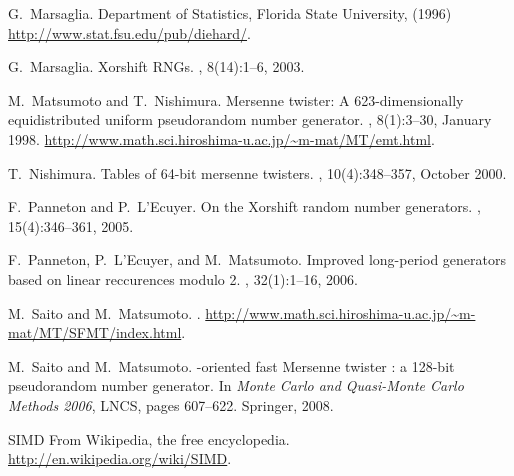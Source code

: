 \documentclass{svmult}
\begin{document}
\begin{thebibliography}{10}
G.~Marsaglia.
\newblock Department of Statistics, Florida State University, (1996)
  \url{http://www.stat.fsu.edu/pub/diehard/}.

G.~Marsaglia.
\newblock Xorshift {RNGs}.
, 8(14):1--6, 2003.

M.~Matsumoto and T.~Nishimura.
\newblock Mersenne twister: A 623-dimensionally equidistributed uniform
  pseudorandom number generator.
, 8(1):3--30,
  January 1998.
\newblock \url{http://www.math.sci.hiroshima-u.ac.jp/~m-mat/MT/emt.html}.

T.~Nishimura.
\newblock Tables of 64-bit mersenne twisters.
, 10(4):348--357,
  October 2000.

F.~Panneton and P.~L'Ecuyer.
\newblock On the {Xorshift} random number generators.
,
  15(4):346--361, 2005.

F.~Panneton, P.~L'Ecuyer, and M.~Matsumoto.
\newblock Improved long-period generators based on linear reccurences modulo 2.
, 32(1):1--16, 2006.

M.~Saito and M.~Matsumoto.
.
\newblock
  \url{http://www.math.sci.hiroshima-u.ac.jp/~m-mat/MT/SFMT/index.html}.

M.~Saito and M.~Matsumoto.
-oriented fast {Mersenne} twister : a 128-bit pseudorandom
  number generator.
\newblock In {\em Monte Carlo and Quasi-Monte Carlo Methods 2006}, LNCS, pages
  607--622. Springer, 2008.

{SIMD From Wikipedia, the free encyclopedia}.
\newblock \url{http://en.wikipedia.org/wiki/SIMD}.

\end{thebibliography}
\end{document}
